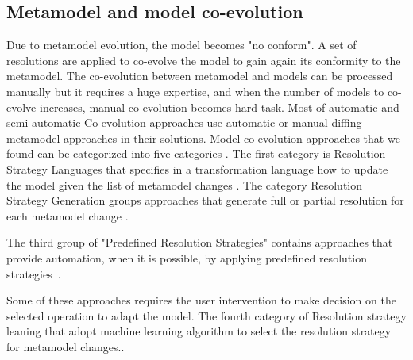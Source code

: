 \subsection{Metamodel and model co-evolution}
Due to metamodel evolution, the model becomes "no conform". A set of resolutions are applied to co-evolve the model to gain again its conformity to the metamodel.
 The co-evolution between metamodel and models can be processed manually but it requires a huge expertise, and when the number of models to co-evolve increases, manual co-evolution becomes hard task. 
 Most of automatic and semi-automatic Co-evolution  approaches use automatic or manual diffing metamodel approaches in their solutions. Model co-evolution approaches that we found can be categorized into five categories \cite{Hebig2017}. The first category is Resolution Strategy Languages that specifies in a transformation language how to update the model given the list of metamodel changes \cite{10.1007/978-3-540-87875-9_44,sprinkle2004domain,wimmer2010using,10.1007/978-3-642-30476-7_13,10.1007/978-3-642-38883-5_10,10.1007/s10270-012-0313-5,10.1007/s10270-012-0296-2}. The category Resolution Strategy Generation groups approaches that generate full or partial resolution for each metamodel change \cite{del2007semi,de2008generating,garces2009managing,meyers2011generic,anguel2014using}.
 
 
 The third group of "Predefined Resolution Strategies" contains approaches that provide automation, when it is possible, by applying predefined resolution strategies \cite{hossler2005coevolution,florez2012coevolution,fernandez2013adapting,wachsmuth2007metamodel,cicchetti2009managing,van2011generic,becker2007process,herrmannsdoerfer2009operation,wittern2013determining}. 
 
 
  Some of these approaches requires the user intervention to make decision on the selected operation to adapt the model.
  The fourth category of Resolution strategy leaning that adopt machine learning algorithm to select the resolution strategy for metamodel changes.\cite{anguel2013towards}.%
 
